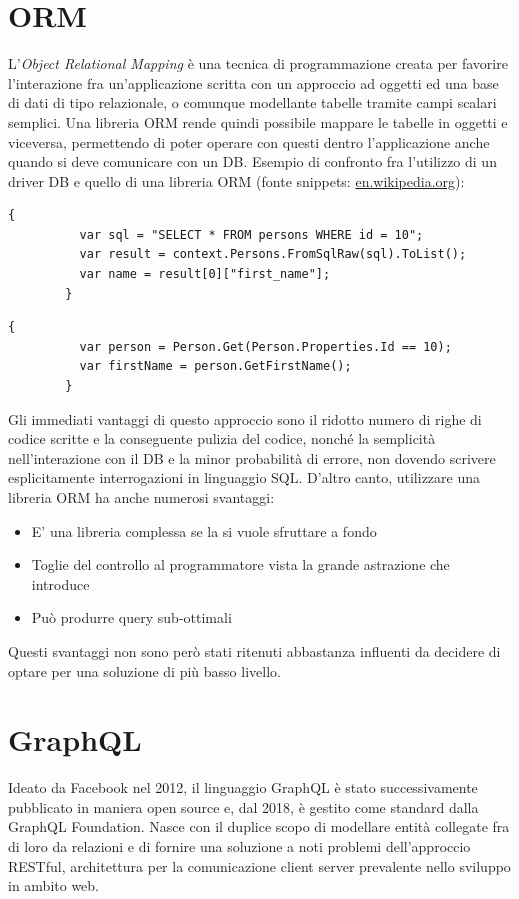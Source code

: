 \documentclass[a4paper, 12pt]{report}
\begin{document}
    \section{ORM}
      L'\emph{Object Relational Mapping} è una tecnica di programmazione creata per favorire l'interazione fra un'applicazione scritta con un approccio ad oggetti ed una base di dati di tipo relazionale, o comunque modellante tabelle tramite campi scalari semplici.
      Una libreria ORM rende quindi possibile mappare le tabelle in oggetti e viceversa, permettendo di poter operare con questi dentro l'applicazione anche quando si deve comunicare con un DB.
      Esempio di confronto fra l'utilizzo di un driver DB e quello di una libreria ORM (fonte snippets: \href{https://en.wikipedia.org/wiki/Object%E2%80%93relational_mapping}{en.wikipedia.org}):
      \begin{Verbatim}[samepage=true]
        {
          var sql = "SELECT * FROM persons WHERE id = 10";
          var result = context.Persons.FromSqlRaw(sql).ToList();
          var name = result[0]["first_name"];
        }
      \end{Verbatim}
      \begin{Verbatim}[samepage=true]
        {
          var person = Person.Get(Person.Properties.Id == 10);
          var firstName = person.GetFirstName();
        }
      \end{Verbatim}
      Gli immediati vantaggi di questo approccio sono il ridotto numero di righe di codice scritte e la conseguente pulizia del codice, nonché la semplicità nell'interazione con il DB e la minor probabilità di errore, non dovendo scrivere esplicitamente interrogazioni in linguaggio SQL.
      D'altro canto, utilizzare una libreria ORM ha anche numerosi svantaggi:
      \begin{itemize}
        \item E' una libreria complessa se la si vuole sfruttare a fondo
        \item Toglie del controllo al programmatore vista la grande astrazione che introduce
        \item Può produrre query sub-ottimali
      \end{itemize}
      Questi svantaggi non sono però stati ritenuti abbastanza influenti da decidere di optare per una soluzione di più basso livello.
    \newpage
    \section{GraphQL}
      Ideato da Facebook nel 2012, il linguaggio GraphQL è stato successivamente pubblicato in maniera open source e, dal 2018, è gestito come standard dalla GraphQL Foundation.
      Nasce con il duplice scopo di modellare entità collegate fra di loro da relazioni e di fornire una soluzione a noti problemi dell'approccio RESTful, architettura per la comunicazione client server prevalente nello sviluppo in ambito web.
\end{document}
